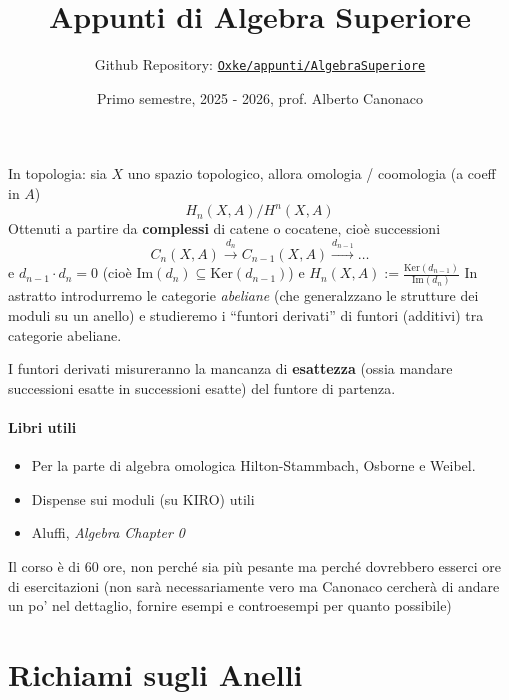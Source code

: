 

\title{Appunti di Algebra Superiore}
\author{Github Repository:
\href{https://github.com/Oxke/appunti/tree/main/AlgebraSuperiore}{\texttt{Oxke/appunti/AlgebraSuperiore}}}

\date{Primo semestre, 2025 \-- 2026, prof. Alberto Canonaco}


\maketitle

In topologia: sia \(X\) uno spazio topologico, allora omologia / coomologia (a
coeff in \(A\)) 
\[
  H_{n}{(X, A)} / H^{n}{(X, A)}
\]
Ottenuti a partire da \textbf{complessi} di catene o cocatene, cioè successioni
\[
    C_{n}{(X, A)} \overset{d_{n}}{\to } C_{n-1} {(X, A)} \overset{d_{n-1} }{\to } \dots
\]
e \(d_{n-1} \cdot d_{n} = 0\) (cioè \(\mathrm {Im} {(d_{n})} \subseteq \mathrm{Ker}{(d_{n-1} )} \))  e \(H_{n} {(X, A)} := \frac{\mathrm{Ker}{(d_{n-1} )}}{\mathrm{Im}{(d_{n})}}\) 
In astratto introdurremo le categorie \emph{abeliane} (che generalzzano le
strutture dei moduli su un anello) e studieremo i ``funtori derivati'' di
funtori (additivi) tra categorie abeliane.

I funtori derivati misureranno la mancanza di \textbf{esattezza} (ossia mandare
successioni esatte in successioni esatte) del funtore di
partenza.

\paragraph{Libri utili}
\begin{itemize}[label = --]
    \item Per la parte di algebra omologica Hilton-Stammbach, Osborne e
Weibel.
    \item Dispense sui moduli (su KIRO) utili
    \item Aluffi, \emph{Algebra Chapter 0}
\end{itemize}
Il corso è di 60 ore, non perché sia più pesante ma perché dovrebbero esserci
ore di esercitazioni (non sarà necessariamente vero ma Canonaco cercherà di
andare un po' nel dettaglio, fornire esempi e controesempi per quanto possibile)


\section{Richiami sugli Anelli}

